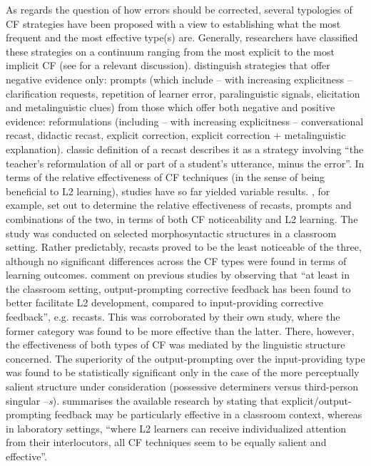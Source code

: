 \documentclass[output=paper,colorlinks,citecolor=brown,modfonts,nonflat]{../langscibook}
\begin{document}
As regards the question of how errors should be corrected, several typologies of CF strategies have been proposed with a view to establishing what the most frequent and the most effective type(s) are. Generally, researchers have classified these strategies on a continuum ranging from the most explicit to the most implicit CF (see \citealt{Sheen2006} for a relevant discussion). \citet{LysterEtAl2013} distinguish strategies that offer negative evidence only: prompts (which include – with increasing explicitness – clarification requests, repetition of learner error, paralinguistic signals, elicitation and metalinguistic clues) from those which offer both negative and positive evidence: reformulations (including – with increasing explicitness – conversational recast, didactic recast, explicit correction, explicit correction + metalinguistic explanation).  classic definition of a recast describes it as a strategy involving “the teacher’s reformulation of all or part of a student’s utterance, minus the error”. In terms of the relative effectiveness of CF techniques (in the sense of being beneficial to L2 learning), studies have so far yielded variable results. \citet{KartchavaAmmar2014}, for example, set out to determine the relative effectiveness of recasts, prompts and combinations of the two, in terms of both CF noticeability and L2 learning. The study was conducted on selected morphosyntactic structures in a classroom setting. Rather predictably, recasts proved to be the least noticeable of the three, although no significant differences across the CF types were found in terms of learning outcomes. \citet[514]{SatoLoewen2018} comment on previous studies by observing that “at least in the classroom setting, output-prompting corrective feedback has been found to better facilitate L2 development, compared to input-providing corrective feedback”, e.g. recasts. This was corroborated by their own study, where the former category was found to be more effective than the latter. There, however, the effectiveness of both types of CF was mediated by the linguistic structure concerned. The superiority of the output-prompting over the input-providing type was found to be statistically significant only in the case of the more perceptually salient structure under consideration (possessive determiners versus third-person singular –\textit{s}). \citet{SaitoInPress} summarises the available research by stating that explicit/output-prompting feedback may be particularly effective in a classroom context, whereas in laboratory settings, “where L2 learners can receive individualized attention from their interlocutors, all CF techniques seem to be equally salient and effective”.
\end{document}
